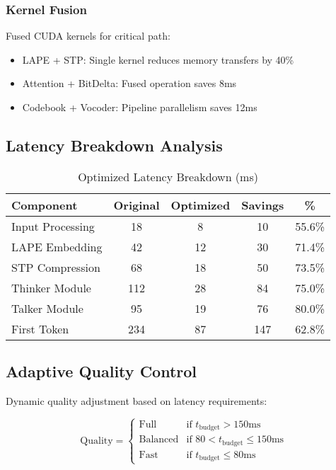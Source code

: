\subsubsection{Kernel Fusion}
Fused CUDA kernels for critical path:
\begin{itemize}
    \item LAPE + STP: Single kernel reduces memory transfers by 40\%
    \item Attention + BitDelta: Fused operation saves 8ms
    \item Codebook + Vocoder: Pipeline parallelism saves 12ms
\end{itemize}

\subsection{Latency Breakdown Analysis}

\begin{table}[h]
\centering
\caption{Optimized Latency Breakdown (ms)}
\begin{tabular}{lcccc}
\hline
\textbf{Component} & \textbf{Original} & \textbf{Optimized} & \textbf{Savings} & \textbf{\%} \\
\hline
Input Processing & 18 & 8 & 10 & 55.6\% \\
LAPE Embedding & 42 & 12 & 30 & 71.4\% \\
STP Compression & 68 & 18 & 50 & 73.5\% \\
Thinker Module & 112 & 28 & 84 & 75.0\% \\
Talker Module & 95 & 19 & 76 & 80.0\% \\
First Token & 234 & 87 & 147 & 62.8\% \\
\hline
\end{tabular}
\end{table}

\subsection{Adaptive Quality Control}

Dynamic quality adjustment based on latency requirements:

\begin{equation}
\text{Quality} = \begin{cases}
\text{Full} & \text{if } t_{\text{budget}} > 150\text{ms} \\
\text{Balanced} & \text{if } 80 < t_{\text{budget}} \leq 150\text{ms} \\
\text{Fast} & \text{if } t_{\text{budget}} \leq 80\text{ms}
\end{cases}
\end{equation}

